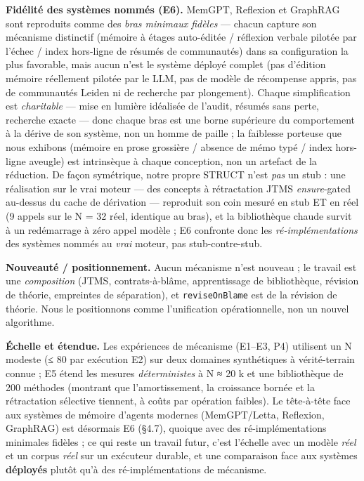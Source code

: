 \documentclass[11pt]{article}
\begin{document}
\textbf{Fidélité des systèmes nommés (E6).} MemGPT, Reflexion et GraphRAG sont reproduits comme des \emph{bras minimaux fidèles} — chacun capture son mécanisme distinctif (mémoire à étages auto-éditée / réflexion verbale pilotée par l'échec / index hors-ligne de résumés de communautés) dans sa configuration la plus favorable, mais aucun n'est le système déployé complet (pas d'édition mémoire réellement pilotée par le LLM, pas de modèle de récompense appris, pas de communautés Leiden ni de recherche par plongement). Chaque simplification est \emph{charitable} — mise en lumière idéalisée de l'audit, résumés sans perte, recherche exacte — donc chaque bras est une borne supérieure du comportement à la dérive de son système, non un homme de paille ; la faiblesse porteuse que nous exhibons (mémoire en prose grossière / absence de mémo typé / index hors-ligne aveugle) est intrinsèque à chaque conception, non un artefact de la réduction. De façon symétrique, notre propre STRUCT n'est \emph{pas} un stub : une réalisation sur le vrai moteur — des concepts à rétractation JTMS \emph{ensure}-gated au-dessus du cache de dérivation — reproduit son coin mesuré en stub ET en réel (9 appels sur le N = 32 réel, identique au bras), et la bibliothèque chaude survit à un redémarrage à zéro appel modèle ; E6 confronte donc les \emph{ré-implémentations} des systèmes nommés au \emph{vrai} moteur, pas stub-contre-stub.

\textbf{Nouveauté / positionnement.} Aucun mécanisme n'est nouveau ; le travail est une \emph{composition} (JTMS, contrats-à-blâme, apprentissage de bibliothèque, révision de théorie, empreintes de séparation), et \texttt{reviseOnBlame} est de la révision de théorie. Nous le positionnons comme l'unification opérationnelle, non un nouvel algorithme.

\textbf{Échelle et étendue.} Les expériences de mécanisme (E1–E3, P4) utilisent un N modeste (≤ 80 par exécution E2) sur deux domaines synthétiques à vérité-terrain connue ; E5 étend les mesures \emph{déterministes} à N ≈ 20 k et une bibliothèque de 200 méthodes (montrant que l'amortissement, la croissance bornée et la rétractation sélective tiennent, à coûts par opération faibles). Le tête-à-tête face aux systèmes de mémoire d'agents modernes (MemGPT/Letta, Reflexion, GraphRAG) est désormais E6 (§4.7), quoique avec des ré-implémentations minimales fidèles ; ce qui reste un travail futur, c'est l'échelle avec un modèle \emph{réel} et un corpus \emph{réel} sur un exécuteur durable, et une comparaison face aux systèmes \textbf{déployés} plutôt qu'à des ré-implémentations de mécanisme.
\end{document}
